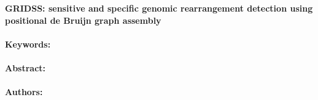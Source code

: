 \noindent
\large {\bf GRIDSS: sensitive and specific genomic rearrangement detection using positional de Bruijn graph assembly} 


\normalsize 


\noindent \paragraph{Keywords:} 

\noindent \paragraph{Abstract:} 



\noindent \paragraph{Authors:} 

